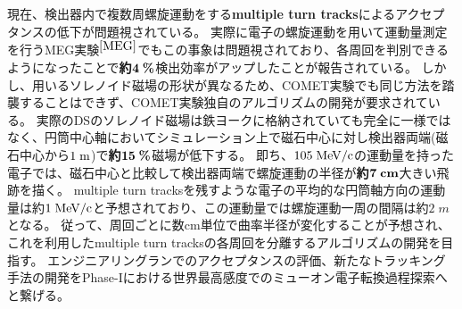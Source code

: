 \documentclass[11pt,a4j,dvipdfmx]{jarticle} 					%
\newcommand{\研究課題名}{COMET Phase-Iに向けたエンジニアリングランおよびその物理解析}
\newcommand{\研究機関名}{大阪大学}
\newcommand{\研究代表者氏名}{高見 翔太   }
\begin{document}
現在、検出器内で複数周螺旋運動をする\textbf{multiple turn tracks}によるアクセプタンスの低下が問題視されている。
実際に電子の螺旋運動を用いて運動量測定を行うMEG実験$^{\cite{MEG}}$でもこの事象は問題視されており、各周回を判別できるようになったことで\textbf{約}$\mathbf{4\;\rm{\textbf{\%}}}$検出効率がアップしたことが報告されている。
しかし、用いるソレノイド磁場の形状が異なるため、COMET実験でも同じ方法を踏襲することはできず、COMET実験独自のアルゴリズムの開発が要求されている。
実際のDSのソレノイド磁場は鉄ヨークに格納されていても完全に一様ではなく、円筒中心軸においてシミュレーション上で磁石中心に対し検出器両端(磁石中心から$1\;\rm{m}$)で\textbf{約}$\mathbf{15\;\rm{\textbf{\%}}}$磁場が低下する。
即ち、$105\;\rm{MeV/c}$の運動量を持った電子では、磁石中心と比較して検出器両端で螺旋運動の半径が\textbf{約}$\mathbf{7\;\rm{\textbf{cm}}}$大きい飛跡を描く。
multiple turn tracksを残すような電子の平均的な円筒軸方向の運動量は約$1\;\rm{MeV/c}$と予想されており、この運動量では螺旋運動一周の間隔は約$2\;{m}$となる。
従って、周回ごとに数cm単位で曲率半径が変化することが予想され、これを利用したmultiple turn tracksの各周回を分離するアルゴリズムの開発を目指す。
エンジニアリングランでのアクセプタンスの評価、新たなトラッキング手法の開発をPhase-Iにおける世界最高感度でのミューオン電子転換過程探索へと繋げる。



\end{document}
